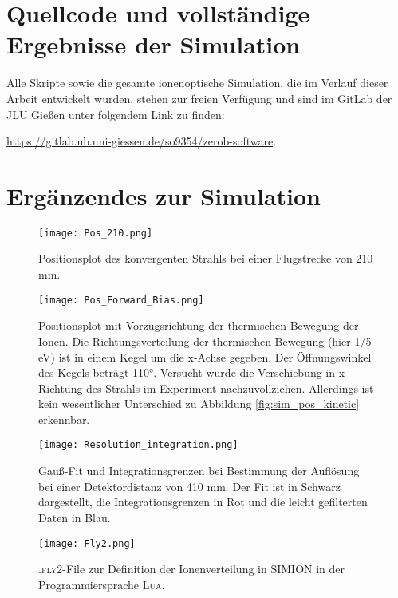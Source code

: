 \clearpage
\section{Quellcode und vollständige Ergebnisse der Simulation}
Alle Skripte sowie die gesamte ionenoptische Simulation, die im Verlauf dieser Arbeit entwickelt wurden, stehen zur freien Verfügung und sind im GitLab der JLU Gießen unter folgendem Link zu finden:

\url{https://gitlab.ub.uni-giessen.de/so9354/zerob-software}.
\section{Ergänzendes zur Simulation}
\begin{figure}[H]
    \centering
    \texttt{[image: Pos\_210.png]}
    \caption[Positionsplot des konvergenten Strahls]{Positionsplot des konvergenten Strahls bei einer Flugstrecke von 210 mm.}
    \label{fig:pos_210}
\end{figure}

\begin{figure}[H]
    \centering
    \texttt{[image: Pos\_Forward\_Bias.png]}
    \caption[Positionsplot mit Vorzugsrichtung der thermischen Bewegung]{Positionsplot mit Vorzugsrichtung der thermischen Bewegung der Ionen. Die Richtungsverteilung der thermischen Bewegung (hier 1/5 eV) ist in einem Kegel um die x-Achse gegeben. Der Öffnungswinkel des Kegels beträgt 110°. Versucht wurde die Verschiebung in x-Richtung des Strahls im Experiment nachzuvollziehen. Allerdings ist kein wesentlicher Unterschied zu Abbildung \ref{fig:sim_pos_kinetic} erkennbar.}
    \label{fig:pos_bias}
\end{figure}   

\begin{landscape}
    \begin{figure}
        \centering
        \hspace{-4cm}\texttt{[image: Resolution\_integration.png]}
        \caption[Gauß-Fit und Integrationsgrenzen bei Bestimmung der Auflösung]{Gauß-Fit und Integrationsgrenzen bei Bestimmung der Auflösung bei einer Detektordistanz von 410 mm. Der Fit ist in Schwarz dargestellt, die Integrationsgrenzen in Rot und die leicht gefilterten Daten in Blau.}
        \label{fig:integrationsgrenzen}
    \end{figure}
\end{landscape}

\begin{figure}
    \centering
    \texttt{[image: Fly2.png]}
    \caption[Ionenverteilung \textsc{.fly2}-File]{\textsc{.fly2}-File zur Definition der Ionenverteilung in \textsc{SIMION} in der Programmiersprache \textsc{Lua}.}
    \label{fly2}
\end{figure}